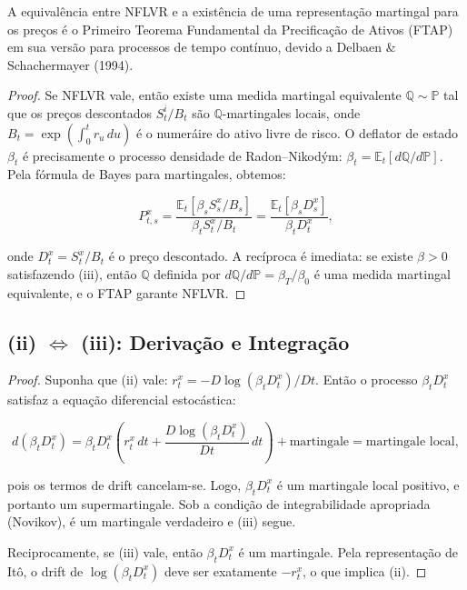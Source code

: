 A equival\^encia entre NFLVR e a exist\^encia de uma representa\c{c}\~ao martingal para os pre\c{c}os \'e o Primeiro Teorema Fundamental da Precifica\c{c}\~ao de Ativos (FTAP) em sua vers\~ao para processos de tempo cont\'inuo, devido a Delbaen \& Schachermayer (1994).

\begin{proof}
Se NFLVR vale, ent\~ao existe uma medida martingal equivalente $\mathbb{Q} \sim \mathbb{P}$ tal que os pre\c{c}os descontados $S_t^i / B_t$ s\~ao $\mathbb{Q}$-martingales locais, onde $B_t = \exp(\int_0^t r_u\, du)$ \'e o numer\'aire do ativo livre de risco. O deflator de estado $\beta_t$ \'e precisamente o processo densidade de Radon--Nikod\'ym: $\beta_t = \mathbb{E}_t[d\mathbb{Q}/d\mathbb{P}]$. Pela f\'ormula de Bayes para martingales, obtemos:

\begin{equation}
P_{t,s}^x = \frac{\mathbb{E}_t[\beta_s S_s^x / B_s]}{\beta_t S_t^x / B_t} = \frac{\mathbb{E}_t[\beta_s D_s^x]}{\beta_t D_t^x},
\end{equation}

onde $D_t^x = S_t^x / B_t$ \'e o pre\c{c}o descontado. A rec\'iproca \'e imediata: se existe $\beta > 0$ satisfazendo (iii), ent\~ao $\mathbb{Q}$ definida por $d\mathbb{Q}/d\mathbb{P} = \beta_T / \beta_0$ \'e uma medida martingal equivalente, e o FTAP garante NFLVR.
\end{proof}

\subsection{(ii) $\Longleftrightarrow$ (iii): Deriva\c{c}\~ao e Integra\c{c}\~ao}

\begin{proof}
Suponha que (ii) vale: $r_t^x = -D \log(\beta_t D_t^x) / Dt$. Ent\~ao o processo $\beta_t D_t^x$ satisfaz a equa\c{c}\~ao diferencial estoc\'astica:

\begin{equation}
d(\beta_t D_t^x) = \beta_t D_t^x \left(r_t^x\, dt + \frac{D \log(\beta_t D_t^x)}{Dt}\,dt\right) + \text{martingale} = \text{martingale local},
\end{equation}

pois os termos de drift cancelam-se. Logo, $\beta_t D_t^x$ \'e um martingale local positivo, e portanto um supermartingale. Sob a condi\c{c}\~ao de integrabilidade apropriada (Novikov), \'e um martingale verdadeiro e (iii) segue.

Reciprocamente, se (iii) vale, ent\~ao $\beta_t D_t^x$ \'e um martingale. Pela representa\c{c}\~ao de It\^o, o drift de $\log(\beta_t D_t^x)$ deve ser exatamente $-r_t^x$, o que implica (ii).
\end{proof}

